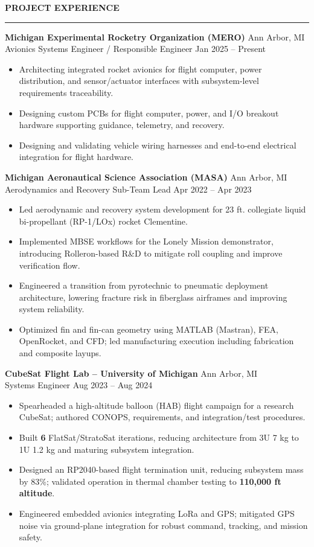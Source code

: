 \documentclass[10pt]{article}
\newcommand{\ressection}[1]{
  \vspace{0.25em}
  {\large\bfseries #1}\par
  \vspace{0.08em}\hrule\vspace{0.20em}
}
\begin{document}
\ressection{PROJECT EXPERIENCE}

{\bfseries Michigan Experimental Rocketry Organization (MERO)} \hfill Ann Arbor, MI \\
Avionics Systems Engineer / Responsible Engineer \hfill Jan 2025 -- Present
\begin{itemize}
\item Architecting integrated rocket avionics for flight computer, power distribution, and sensor/actuator interfaces with subsystem-level requirements traceability.
\item Designing custom PCBs for flight computer, power, and I/O breakout hardware supporting guidance, telemetry, and recovery.
\item Designing and validating vehicle wiring harnesses and end-to-end electrical integration for flight hardware.
\end{itemize}

{\bfseries Michigan Aeronautical Science Association (MASA)} \hfill Ann Arbor, MI \\
Aerodynamics and Recovery Sub-Team Lead \hfill Apr 2022 -- Apr 2023
\begin{itemize}
  \item Led aerodynamic and recovery system development for 23 ft. collegiate liquid bi-propellant (RP-1/LOx) rocket Clementine.
  \item Implemented MBSE workflows for the Lonely Mission demonstrator, introducing Rolleron-based R\&D to mitigate roll coupling and improve verification flow.
  \item Engineered a transition from pyrotechnic to pneumatic deployment architecture, lowering fracture risk in fiberglass airframes and improving system reliability.
  \item Optimized fin and fin-can geometry using MATLAB (Mastran), FEA, OpenRocket, and CFD; led manufacturing execution including fabrication and composite layups.
\end{itemize}

{\bfseries CubeSat Flight Lab -- University of Michigan} \hfill Ann Arbor, MI \\
Systems Engineer \hfill Aug 2023 -- Aug 2024
\begin{itemize}
  \item Spearheaded a high-altitude balloon (HAB) flight campaign for a research CubeSat; authored CONOPS, requirements, and integration/test procedures.
  \item Built {\bfseries 6} FlatSat/StratoSat iterations, reducing architecture from 3U 7 kg to 1U 1.2 kg and maturing subsystem integration.
  \item Designed an RP2040-based flight termination unit, reducing subsystem mass by 83\%; validated operation in thermal chamber testing to {\bfseries 110,000 ft altitude}.
  \item Engineered embedded avionics integrating LoRa and GPS; mitigated GPS noise via ground-plane integration for robust command, tracking, and mission safety.
\end{itemize}
\end{document}
